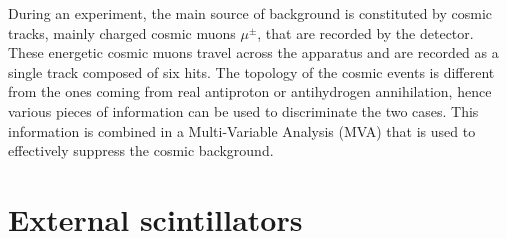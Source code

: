 During an experiment, the main source of background is constituted by cosmic tracks, mainly charged cosmic muons $\mu^{\pm}$, that are recorded by the detector. These energetic cosmic muons travel across the apparatus and are recorded as a single track composed of six hits. The topology of the cosmic events is different from the ones coming from real antiproton or antihydrogen annihilation, hence various pieces of information can be used to discriminate the two cases. This information is combined in a Multi-Variable Analysis (MVA) that is used to effectively suppress the cosmic background.

\section{External scintillators}

